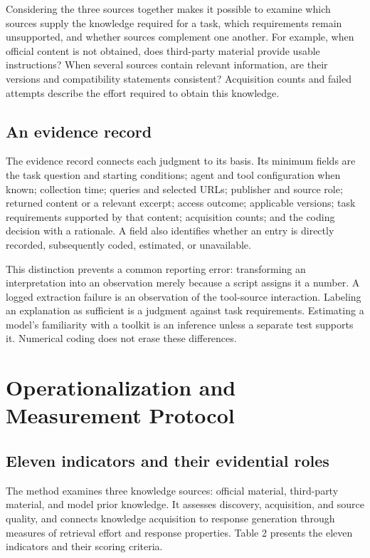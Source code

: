 \documentclass[manuscript,review,anonymous]{acmart}
\begin{document}
Considering the three sources together makes it possible to examine which sources supply the knowledge required for a task, which requirements remain unsupported, and whether sources complement one another. For example, when official content is not obtained, does third-party material provide usable instructions? When several sources contain relevant information, are their versions and compatibility statements consistent? Acquisition counts and failed attempts describe the effort required to obtain this knowledge.

\subsection{An evidence record}\label{an-evidence-record}

The evidence record connects each judgment to its basis. Its minimum fields are the task question and starting conditions; agent and tool configuration when known; collection time; queries and selected URLs; publisher and source role; returned content or a relevant excerpt; access outcome; applicable versions; task requirements supported by that content; acquisition counts; and the coding decision with a rationale. A field also identifies whether an entry is directly recorded, subsequently coded, estimated, or unavailable.

This distinction prevents a common reporting error: transforming an interpretation into an observation merely because a script assigns it a number. A logged extraction failure is an observation of the tool-source interaction. Labeling an explanation as sufficient is a judgment against task requirements. Estimating a model's familiarity with a toolkit is an inference unless a separate test supports it. Numerical coding does not erase these differences.

\section{Operationalization and Measurement Protocol}\label{operationalization-and-measurement-protocol}

\subsection{Eleven indicators and their evidential roles}\label{eleven-indicators-and-their-evidential-roles}

The method examines three knowledge sources: official material, third-party material, and model prior knowledge. It assesses discovery, acquisition, and source quality, and connects knowledge acquisition to response generation through measures of retrieval effort and response properties. Table 2 presents the eleven indicators and their scoring criteria.
\end{document}
